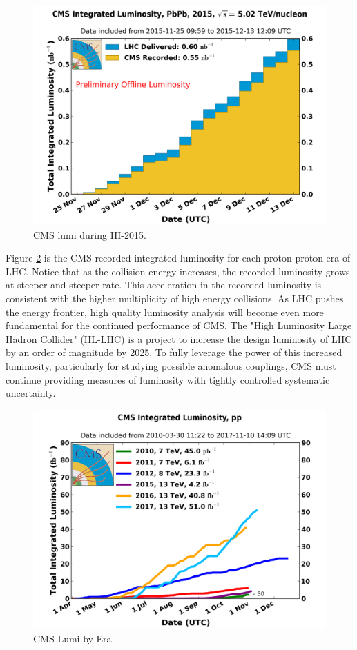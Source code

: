 \begin{figure}[h!]
\begin{centering}
\includegraphics[width=6in]{Chapter4/importfigs/int_lumi_per_day_cumulative_pbpb_2015_pbpb.png}
\par\end{centering}
\caption{CMS lumi during HI-2015. \label{fig:lumiHi2015}}
\end{figure}

Figure \ref{fig:lumiCMSEra} is the CMS-recorded integrated luminosity for each proton-proton era of LHC. Notice that as the collision energy increases, the recorded luminosity grows at steeper and steeper rate. This acceleration in the recorded luminosity is consistent with the higher multiplicity of high energy collisions. As LHC pushes the energy frontier, high quality luminosity analysis will become even more fundamental for the continued performance of CMS. The "High Luminosity Large Hadron Collider" (HL-LHC) is a project to increase the design luminosity of LHC by an order of magnitude by 2025. To fully leverage the power of this increased luminosity, particularly for studying possible anomalous couplings, CMS must continue providing measures of luminosity with tightly controlled systematic uncertainty. 

\begin{figure}[h!]
\begin{centering}
\includegraphics[width=6in]{Chapter4/importfigs/int_lumi_cumulative_pp_2.png}
\par\end{centering}
\caption{CMS Lumi by Era. \label{fig:lumiCMSEra}}
\end{figure}